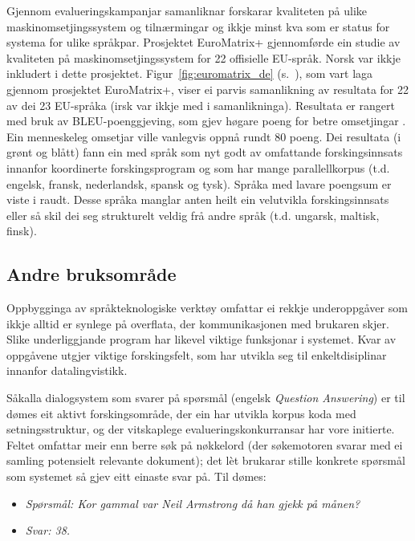 \begin{multicols}{2}
Gjennom evalueringskampanjar samanliknar forskarar kvaliteten på ulike maskinomsetjingssystem og tilnærmingar og ikkje minst kva som er status for systema for ulike språkpar.
Prosjektet EuroMatrix+ gjennomførde ein studie av kvaliteten på maskinomsetjingssystem for 22 offisielle EU-språk. Norsk var ikkje inkludert i dette prosjektet.
Figur~\ref{fig:euromatrix_de} (s.~\pageref{fig:euromatrix_de}), som vart laga gjennom prosjektet EuroMatrix+, viser ei parvis samanlikning av resultata for 22 av dei 23 EU-språka (irsk var ikkje med i samanlikninga). Resultata er rangert med bruk av BLEU-poenggjeving, som gjev høgare poeng for betre omsetjingar \cite{bleu1}. Ein menneskeleg omsetjar ville vanlegvis oppnå rundt 80 poeng. Dei resultata (i grønt og blått) fann ein med språk som nyt godt av omfattande forskingsinnsats innanfor koordinerte forskingsprogram og som har mange parallellkorpus (t.d. engelsk, fransk, nederlandsk, spansk og tysk). Språka med lavare poengsum er viste i raudt. Desse språka manglar anten heilt ein velutvikla forskingsinnsats eller så skil dei seg strukturelt veldig frå andre språk (t.d. ungarsk, maltisk, finsk).  

\subsection{Andre bruksområde}

Oppbygginga av språkteknologiske verktøy omfattar ei rekkje underoppgåver som ikkje alltid er synlege på overflata, der kommunikasjonen med brukaren skjer. Slike underliggjande program har likevel viktige funksjonar i systemet. Kvar av oppgåvene utgjer viktige forskingsfelt, som har utvikla seg til enkeltdisiplinar innanfor datalingvistikk. 

Såkalla dialogsystem som svarer på spørsmål (engelsk \textit{Question Answering}) er til dømes eit aktivt forskingsområde, der ein har utvikla korpus koda med setningsstruktur, og der vitskaplege evalueringskonkurransar har vore initierte. Feltet omfattar meir enn berre søk på nøkkelord (der søkemotoren svarar med ei samling potensielt relevante dokument); det lèt brukarar stille konkrete spørsmål som systemet så gjev eitt einaste svar på. Til dømes:
\begin{itemize}
\item[] \textit{Spørsmål: Kor gammal var Neil Armstrong då han gjekk på månen?}
\item[] \textit{Svar: 38.}
\end{itemize}


\end{multicols}

